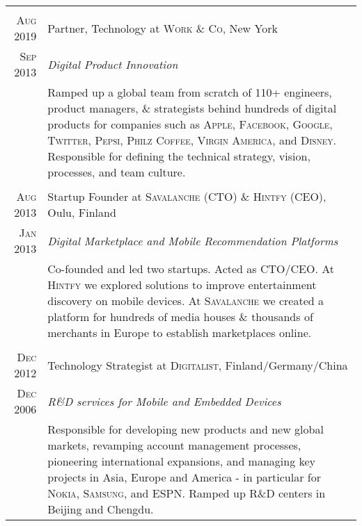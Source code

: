\documentclass[a4paper,10pt]{article}
\begin{document}
\begin{tabular}{r|p{14cm}}
  \multicolumn{2}{c}{}\\

  \textsc{Aug 2019} & Partner, Technology at \textsc{Work \& Co}, New York \\

  \textsc{Sep 2013} & \emph{Digital Product Innovation}\\

  &\footnotesize{Ramped up a global team from scratch of 110+
    engineers, product managers, \& strategists behind hundreds of
    digital products for companies such as \textsc{Apple},
    \textsc{Facebook}, \textsc{Google}, \textsc{Twitter},
    \textsc{Pepsi}, \textsc{Philz Coffee}, \textsc{Virgin America},
    and \textsc{Disney}. Responsible for defining the technical
    strategy, vision, processes, and team culture.}\\

  \multicolumn{2}{c}{}\\

  \textsc{Aug 2013} & Startup Founder at \textsc{Savalanche} (CTO) \&
  \textsc{Hintfy} (CEO), Oulu, Finland \\

  \textsc{Jan 2013} & \emph{Digital Marketplace and Mobile Recommendation Platforms} \\

  &\footnotesize{Co-founded and led two startups. Acted as
    \textsc{CTO/CEO}. At \textsc{Hintfy} we explored solutions to
    improve entertainment discovery on mobile devices. At
    \textsc{Savalanche} we created a platform for hundreds of media
    houses \& thousands of merchants in Europe to establish
    marketplaces online.}\\

  \multicolumn{2}{c}{}\\

  \textsc{Dec 2012} & Technology Strategist at \textsc{Digitalist},
  Finland/Germany/China \\

  \textsc{Dec 2006} & \emph{R\&D services for Mobile and Embedded Devices} \\

  &\footnotesize{Responsible for developing new products and new global markets,
    revamping account management processes, pioneering international expansions,
    and managing key projects in Asia, Europe and America - in particular for
    \textsc{Nokia}, \textsc{Samsung}, and \textsc{ESPN}. Ramped up R\&D centers
    in Beijing and Chengdu.}\\


\end{tabular}
\end{document}
